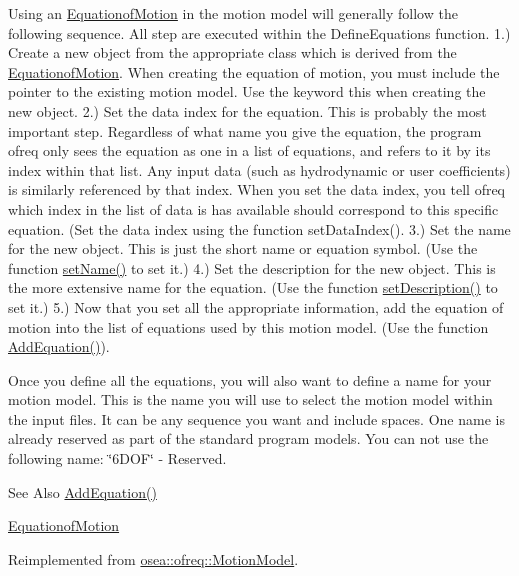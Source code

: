 Using an \hyperlink{classosea_1_1ofreq_1_1_equationof_motion}{Equationof\-Motion} in the motion model will generally follow the following sequence. All step are executed within the Define\-Equations function. 1.) Create a new object from the appropriate class which is derived from the \hyperlink{classosea_1_1ofreq_1_1_equationof_motion}{Equationof\-Motion}. When creating the equation of motion, you must include the pointer to the existing motion model. Use the keyword this when creating the new object. 2.) Set the data index for the equation. This is probably the most important step. Regardless of what name you give the equation, the program ofreq only sees the equation as one in a list of equations, and refers to it by its index within that list. Any input data (such as hydrodynamic or user coefficients) is similarly referenced by that index. When you set the data index, you tell ofreq which index in the list of data is has available should correspond to this specific equation. (Set the data index using the function set\-Data\-Index(). 3.) Set the name for the new object. This is just the short name or equation symbol. (Use the function \hyperlink{classosea_1_1ofreq_1_1_motion_model_a42d989727028c18c59ba04f958bc7b74}{set\-Name()} to set it.) 4.) Set the description for the new object. This is the more extensive name for the equation. (Use the function \hyperlink{classosea_1_1ofreq_1_1_motion_model_a5097540bb98ad753594d41890e6ef30d}{set\-Description()} to set it.) 5.) Now that you set all the appropriate information, add the equation of motion into the list of equations used by this motion model. (Use the function \hyperlink{classosea_1_1ofreq_1_1_motion_model_a73489d88c07b26109bbb9bdd0a576b30}{Add\-Equation()}).

Once you define all the equations, you will also want to define a name for your motion model. This is the name you will use to select the motion model within the input files. It can be any sequence you want and include spaces. One name is already reserved as part of the standard program models. You can not use the following name\-: \char`\"{}6\-D\-O\-F\char`\"{} -\/ Reserved.

\begin{DoxySeeAlso}{See Also}
\hyperlink{classosea_1_1ofreq_1_1_motion_model_a73489d88c07b26109bbb9bdd0a576b30}{Add\-Equation()} 

\hyperlink{classosea_1_1ofreq_1_1_equationof_motion}{Equationof\-Motion} 
\end{DoxySeeAlso}


Reimplemented from \hyperlink{classosea_1_1ofreq_1_1_motion_model_a001b525e45be6f6c8f9088dacbb161c6}{osea\-::ofreq\-::\-Motion\-Model}.



